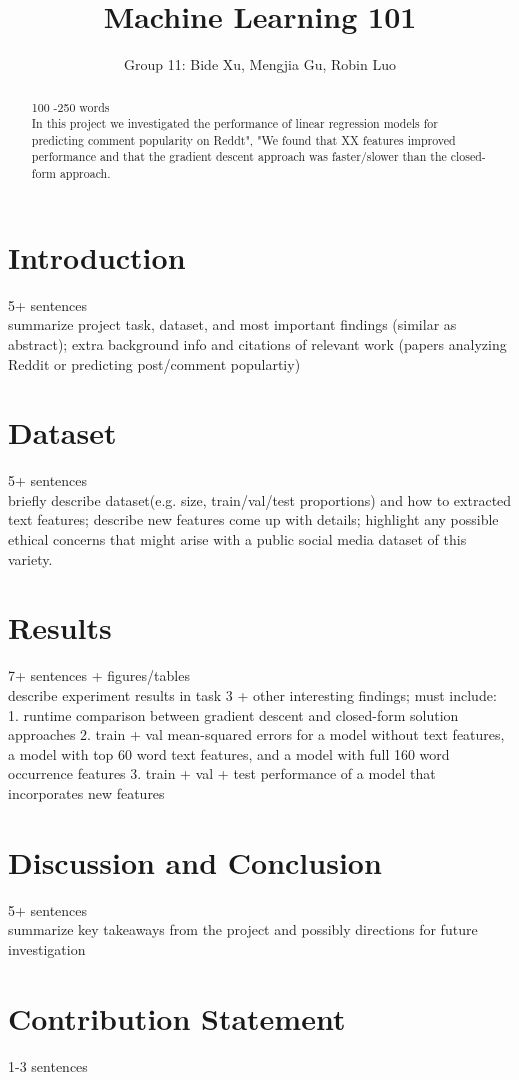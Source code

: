 \documentclass[a4paper, 12pt]{article}
\title{Machine Learning 101}
\author{Group 11: Bide Xu, Mengjia Gu, Robin Luo}
\begin{document}
\maketitle

\newpage
\begin{abstract}
100 -250 words\\
In this project we investigated the performance of linear regression models for predicting comment popularity on Reddt", "We found that XX features improved performance and that the gradient descent approach was faster/slower than the closed-form approach.
\end{abstract}

\section*{Introduction}
5+ sentences\\
summarize project task, dataset, and most important findings (similar as abstract); extra background info and citations of relevant work (papers analyzing Reddit or predicting post/comment populartiy)

\section*{Dataset}
5+ sentences\\
briefly describe dataset(e.g. size, train/val/test proportions) and how to extracted text features; describe new features come up with details; highlight any possible ethical concerns that might arise with a public social media dataset of this variety.

\section*{Results}
7+ sentences + figures/tables\\
describe experiment results in task 3 + other interesting findings; must include:\\
1. runtime comparison between gradient descent and closed-form solution approaches
2. train + val mean-squared errors for a model without text features, a model with top 60 word text features, and a model with full 160 word occurrence features
3. train + val + test performance of a model that incorporates new features

\section*{Discussion and Conclusion}
5+ sentences\\
summarize key takeaways from the project and possibly directions for future investigation

\newpage
\section*{Contribution Statement}
1-3 sentences
\end{document}
